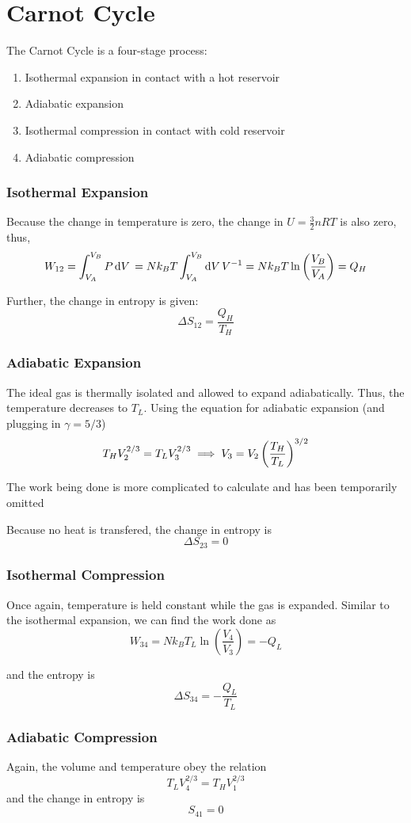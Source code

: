 \section{Carnot Cycle}
The Carnot Cycle is a four-stage process:
\begin{enumerate}
	\item Isothermal expansion in contact with a hot reservoir
	\item Adiabatic expansion
	\item Isothermal compression in contact with cold reservoir
	\item Adiabatic compression
\end{enumerate}


\subsubsection{Isothermal Expansion}
Because the change in temperature is zero, the change in \(U=\frac{3}{2}nRT\) is also zero, thus,
\[W_{12}=\int_{V_A}^{V_B}P\d{V}=Nk_BT\int_{V_A}^{V_B}\d{V} V^{-1} = Nk_BT\ln\left(\frac{V_B}{V_A}\right)=Q_H\]

Further, the change in entropy is given:
\[\Delta S_{12}=\frac{Q_H}{T_H}\]

\subsubsection{Adiabatic Expansion}
The ideal gas is thermally isolated and allowed to expand adiabatically. Thus, the temperature decreases to \(T_L\). Using the equation for adiabatic expansion (and plugging in \(\gamma=5/3\))
\[T_HV_2^{2/3}=T_LV_3^{2/3}\implies V_3=V_2\left(\frac{T_H}{T_L}\right)^{3/2}\]

The work being done is more complicated to calculate and has been temporarily omitted

Because no heat is transfered, the change in entropy is
\[\Delta S_{23}=0\]

\subsubsection{Isothermal Compression}
Once again, temperature is held constant while the gas is expanded. Similar to the isothermal expansion, we can find the work done as
\[W_{34}=Nk_BT_L\ln\left(\frac{V_4}{V_3}\right)=-Q_L\]

and the entropy is
\[\Delta S_{34} = -\frac{Q_L}{T_L}\]

\subsubsection{Adiabatic Compression}
Again, the volume and temperature obey the relation
\[T_LV_4^{2/3}=T_HV_1^{2/3}\]
and the change in entropy is
\[S_{41}=0\]

